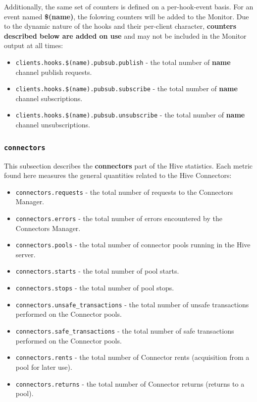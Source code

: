 \documentclass[a4paper]{article}
\begin{document}
\begin{itemize}
\noindent
Additionally, the same set of counters is defined on a per-hook-event basis. For an event named \textbf{\$(name)}, the folowing counters will be added to the Monitor. Due to the dynamic nature of the hooks and their per-client character, \textbf{counters described below are added on use} and may not be included in the Monitor output at all times:


\begin{itemize}
\item \texttt{clients.hooks.\$(name).pubsub.publish} - the total number of \textbf{name} channel publish requests.
\item \texttt{clients.hooks.\$(name).pubsub.subscribe} - the total number of \textbf{name} channel subscriptions.
\item \texttt{clients.hooks.\$(name).pubsub.unsubscribe} - the total number of \textbf{name} channel unsubscriptions.
\end{itemize}

\end{itemize} %
\subsubsection{\texttt{connectors}}
\label{sec-4-2-11}

This subsection describes the \textbf{connectors} part of the Hive statistics. Each metric found here measures the general quantities related to the Hive Connectors:


\begin{itemize}
\item \texttt{connectors.requests} - the total number of requests to the Connectors Manager.
\item \texttt{connectors.errors} - the total number of errors encountered by the Connectors Manager.
\item \texttt{connectors.pools} - the total number of connector pools running in the Hive server.
\item \texttt{connectors.starts} - the total number of pool starts.
\item \texttt{connectors.stops} - the total number of pool stops.
\item \texttt{connectors.unsafe\_transactions} - the total number of unsafe transactions performed on the Connector pools.
\item \texttt{connectors.safe\_transactions} - the total number of safe transactions performed on the Connector pools.
\item \texttt{connectors.rents} - the total number of Connector rents (acquisition from a pool for later use).
\item \texttt{connectors.returns} - the total number of Connector returns (returns to a pool).
\end{itemize}
\end{document}
